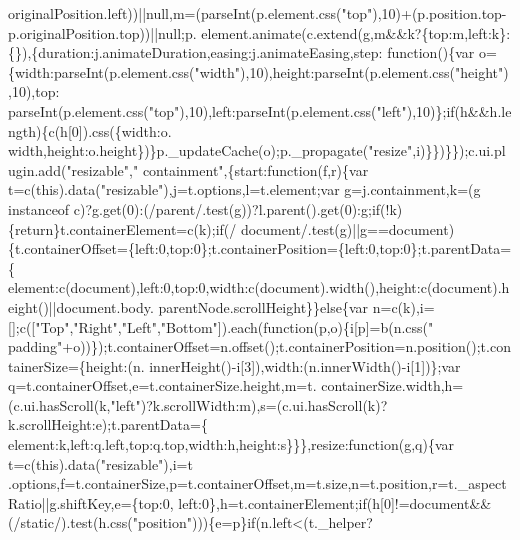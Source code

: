 \begin{DoxyCode}
      originalPosition.left))||null,m=(parseInt(p.element.css(\textcolor{stringliteral}{"top"}),10)+(p.position.top-p.originalPosition.top))||null;p.
      element.animate(c.extend(g,m&&k?\{top:m,left:k\}:\{\}),\{duration:j.animateDuration,easing:j.animateEasing,step:\textcolor{keyword}{
      function}()\{var o=\{width:parseInt(p.element.css(\textcolor{stringliteral}{"width"}),10),height:parseInt(p.element.css(\textcolor{stringliteral}{"height"}),10),top:
      parseInt(p.element.css(\textcolor{stringliteral}{"top"}),10),left:parseInt(p.element.css(\textcolor{stringliteral}{"left"}),10)\};\textcolor{keywordflow}{if}(h&&h.length)\{c(h[0]).css(\{width:o.
      width,height:o.height\})\}p.\_updateCache(o);p.\_propagate(\textcolor{stringliteral}{"resize"},i)\}\})\}\});c.ui.plugin.add(\textcolor{stringliteral}{"resizable"},\textcolor{stringliteral}{"
      containment"},\{start:\textcolor{keyword}{function}(f,r)\{var t=c(\textcolor{keyword}{this}).data(\textcolor{stringliteral}{"resizable"}),j=t.options,l=t.element;var g=j.containment,k=(g 
      instanceof c)?g.get(0):(/parent/.test(g))?l.parent().get(0):g;\textcolor{keywordflow}{if}(!k)\{\textcolor{keywordflow}{return}\}t.containerElement=c(k);\textcolor{keywordflow}{if}(/
      document/.test(g)||g==document)\{t.containerOffset=\{left:0,top:0\};t.containerPosition=\{left:0,top:0\};t.parentData=\{
      element:c(document),left:0,top:0,width:c(document).width(),height:c(document).height()||document.body.
      parentNode.scrollHeight\}\}\textcolor{keywordflow}{else}\{var n=c(k),i=[];c([\textcolor{stringliteral}{"Top"},\textcolor{stringliteral}{"Right"},\textcolor{stringliteral}{"Left"},\textcolor{stringliteral}{"Bottom"}]).each(\textcolor{keyword}{function}(p,o)\{i[p]=b(n.css(\textcolor{stringliteral}{"
      padding"}+o))\});t.containerOffset=n.offset();t.containerPosition=n.position();t.containerSize=\{height:(n.
      innerHeight()-i[3]),width:(n.innerWidth()-i[1])\};var q=t.containerOffset,e=t.containerSize.height,m=t.
      containerSize.width,h=(c.ui.hasScroll(k,\textcolor{stringliteral}{"left"})?k.scrollWidth:m),s=(c.ui.hasScroll(k)?k.scrollHeight:e);t.parentData=\{
      element:k,left:q.left,top:q.top,width:h,height:s\}\}\},resize:\textcolor{keyword}{function}(g,q)\{var t=c(\textcolor{keyword}{this}).data(\textcolor{stringliteral}{"resizable"}),i=t
      .options,f=t.containerSize,p=t.containerOffset,m=t.size,n=t.position,r=t.\_aspectRatio||g.shiftKey,e=\{top:0,
      left:0\},h=t.containerElement;\textcolor{keywordflow}{if}(h[0]!=document&&(/\textcolor{keyword}{static}/).test(h.css(\textcolor{stringliteral}{"position"})))\{e=p\}\textcolor{keywordflow}{if}(n.left<(t.\_helper?

\end{DoxyCode}
